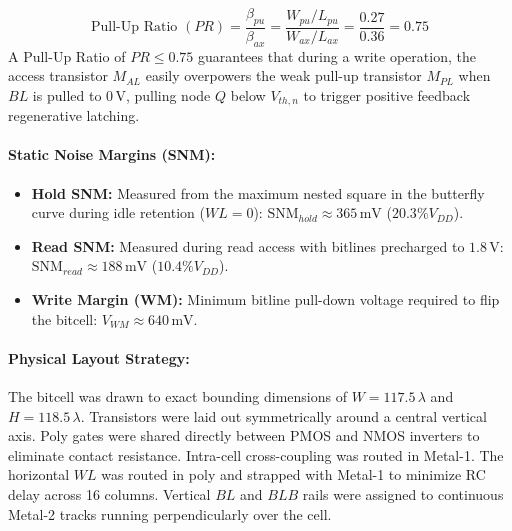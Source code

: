 \documentclass[10pt,a4paper,titlepage]{article}
\begin{document}
\begin{equation}
    \text{Pull-Up Ratio } (PR) = \frac{\beta_{pu}}{\beta_{ax}} = \frac{W_{pu} / L_{pu}}{W_{ax} / L_{ax}} = \frac{0.27}{0.36} = 0.75
\end{equation}
A Pull-Up Ratio of $PR \le 0.75$ guarantees that during a write operation, the access transistor $M_{AL}$ easily overpowers the weak pull-up transistor $M_{PL}$ when $BL$ is pulled to $0\,\text{V}$, pulling node $Q$ below $V_{th,n}$ to trigger positive feedback regenerative latching.

\paragraph{Static Noise Margins (SNM):}
\begin{itemize}[itemsep=2pt]
    \item \textbf{Hold SNM:} Measured from the maximum nested square in the butterfly curve during idle retention ($WL = 0$): $\text{SNM}_{hold} \approx 365\,\text{mV}$ ($20.3\% V_{DD}$).
    \item \textbf{Read SNM:} Measured during read access with bitlines precharged to $1.8\,\text{V}$: $\text{SNM}_{read} \approx 188\,\text{mV}$ ($10.4\% V_{DD}$).
    \item \textbf{Write Margin (WM):} Minimum bitline pull-down voltage required to flip the bitcell: $V_{WM} \approx 640\,\text{mV}$.
\end{itemize}

\paragraph{Physical Layout Strategy:} The bitcell was drawn to exact bounding dimensions of $W = 117.5\,\lambda$ and $H = 118.5\,\lambda$. Transistors were laid out symmetrically around a central vertical axis. Poly gates were shared directly between PMOS and NMOS inverters to eliminate contact resistance. Intra-cell cross-coupling was routed in Metal-1. The horizontal $WL$ was routed in poly and strapped with Metal-1 to minimize RC delay across 16 columns. Vertical $BL$ and $BLB$ rails were assigned to continuous Metal-2 tracks running perpendicularly over the cell.
\end{document}
